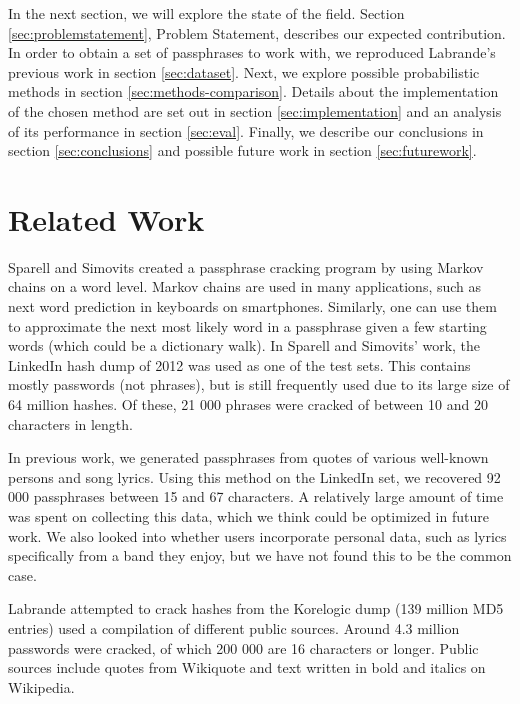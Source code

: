 \documentclass{article}
\begin{document}
In the next section, we will explore the state of the field. Section
\ref{sec:problemstatement}, Problem Statement, describes our expected
contribution. In order to obtain a set of passphrases to work with, we
reproduced Labrande's previous work in section \ref{sec:dataset}. Next, we
explore possible probabilistic methods in section \ref{sec:methods-comparison}.
Details about the implementation of the chosen method are set out in section
\ref{sec:implementation} and an analysis of its performance in section
\ref{sec:eval}. Finally, we describe our conclusions in section
\ref{sec:conclusions} and possible future work in section \ref{sec:futurework}.


\section{Related Work}

Sparell and Simovits\cite{sparell-simovits} created a passphrase cracking
program by using Markov chains on a word level. Markov chains are used in many
applications, such as next word prediction in keyboards on smartphones.
Similarly, one can use them to approximate the next most likely word in a
passphrase given a few starting words (which could be a dictionary walk). In
Sparell and Simovits' work, the LinkedIn hash dump of 2012 was used as one of
the test sets. This contains mostly passwords (not phrases), but is still
frequently used due to its large size of 64 million hashes. Of these, 21 000
phrases were cracked of between 10 and 20 characters in length.

In previous work, we\cite{own} generated passphrases from quotes of various
well-known persons and song lyrics. Using this method on the LinkedIn set, we
recovered 92 000 passphrases between 15 and 67 characters. A relatively large
amount of time was spent on collecting this data, which we think could be
optimized in future work. We also looked into whether users incorporate
personal data, such as lyrics specifically from a band they enjoy, but we have
not found this to be the common case.

Labrande\cite{crackmeimfamous} attempted to crack hashes from the Korelogic
dump (139 million MD5 entries) used a compilation of different public sources.
Around 4.3 million passwords were cracked, of which 200 000 are 16 characters
or longer. Public sources include quotes from Wikiquote and text written in
bold and italics on Wikipedia.
\end{document}
